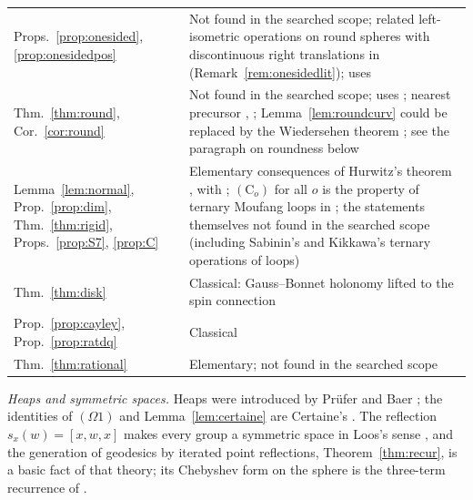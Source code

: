 \documentclass[11pt,reqno]{amsart}
\theoremstyle{definition}
\theoremstyle{remark}
\numberwithin{equation}{section}
\newcommand{\hp}[3]{[#1,#2,#3]}
\begin{document}
\begin{center}
\begin{tabular}{@{}p{}p{}@{}}
Props.~\ref{prop:onesided}, \ref{prop:onesidedpos} & Not found in the searched scope; related left-isometric operations on round spheres with discontinuous right translations in \cite{Kinyon00} (Remark~\ref{rem:onesidedlit}); uses \cite{HK15,Adams}\\
Thm.~\ref{thm:round}, Cor.~\ref{cor:round} & Not found in the searched scope; uses \cite{HK15}; nearest precursor \cite[Thm.~11]{BN09}, \cite{DN68}; Lemma~\ref{lem:roundcurv} could be replaced by the Wiedersehen theorem \cite{Green63,Besse78,Weinstein74,Yang80,McKay16}; see the paragraph on roundness below\\
Lemma~\ref{lem:normal}, Prop.~\ref{prop:dim}, Thm.~\ref{thm:rigid}, Props.~\ref{prop:S7}, \ref{prop:C} & Elementary consequences of Hurwitz's theorem \cite{Hurwitz1898,SV00,CS03}, with \cite{Baez02,Schafer66}; $(\mathrm C_o)$ for all $o$ is the property of ternary Moufang loops in \cite[Lemma~3.4, Remark~(3)]{BK12}; the statements themselves not found in the searched scope (including Sabinin's and Kikkawa's ternary operations of loops)\\
Thm.~\ref{thm:disk} & Classical: Gauss--Bonnet holonomy lifted to the spin connection \cite{doCarmo76,SB88}\\
Prop.~\ref{prop:cayley}, Prop.~\ref{prop:ratdq} & Classical \cite{Cayley,Rodrigues,Shuster,SJ,DLP,Iserles01}\\
Thm.~\ref{thm:rational} & Elementary; not found in the searched scope\\
\bottomrule
\end{tabular}
\end{center}

\emph{Heaps and symmetric spaces.}  Heaps were introduced by Pr\"ufer and Baer \cite{Prufer,Baer}; the
identities of $(\Omega1)$ and Lemma~\ref{lem:certaine} are Certaine's \cite{Certaine}.  The reflection
$s_x(w)=\hp xwx$ makes every group a symmetric space in Loos's sense \cite{Loos}, and the generation of
geodesics by iterated point reflections, Theorem~\ref{thm:recur}, is a basic fact of that theory; its Chebyshev
form on the sphere is the three-term recurrence of \cite{MH}.
\end{document}
